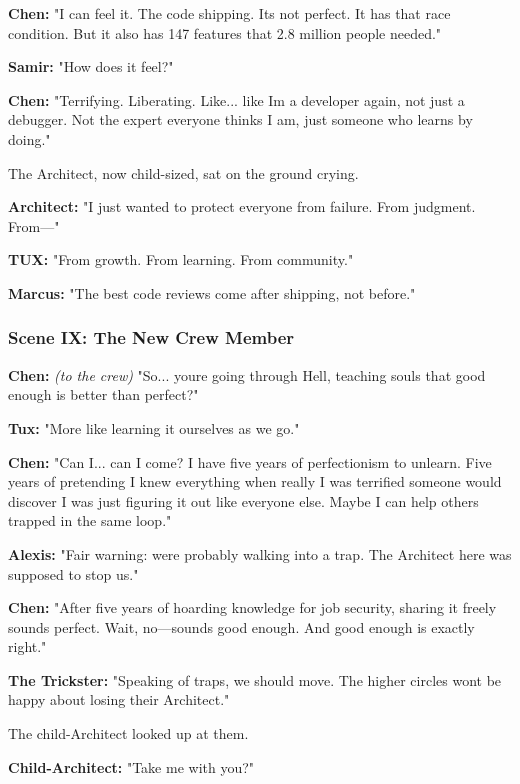 \textbf{Chen:} "I can feel it. The code shipping. It\textquotesingle s not perfect. It has that race condition. But it also has 147 features that 2.8 million people needed."

\textbf{Samir:} "How does it feel?"

\textbf{Chen:} "Terrifying. Liberating. Like... like I\textquotesingle m a developer again, not just a debugger. Not the \textquotesingle expert\textquotesingle{} everyone thinks I am, just someone who learns by doing."

The Architect, now child-sized, sat on the ground crying.

\textbf{Architect:} "I just wanted to protect everyone from failure. From judgment. From---"

\textbf{TUX:} "From growth. From learning. From community."

\textbf{Marcus:} "The best code reviews come after shipping, not before."

\bookdivider

\subsubsection{Scene IX: The New Crew Member}\label{scene-ix-the-new-crew-member}

\textbf{Chen:} \emph{(to the crew)} "So... you\textquotesingle re going through Hell, teaching souls that good enough is better than perfect?"

\textbf{Tux:} "More like learning it ourselves as we go."

\textbf{Chen:} "Can I... can I come? I have five years of perfectionism to unlearn. Five years of pretending I knew everything when really I was terrified someone would discover I was just figuring it out like everyone else. Maybe I can help others trapped in the same loop."

\textbf{Alexis:} "Fair warning: we\textquotesingle re probably walking into a trap. The Architect here was supposed to stop us."

\textbf{Chen:} "After five years of hoarding knowledge for job security, sharing it freely sounds perfect. Wait, no---sounds good enough. And good enough is exactly right."

\textbf{The Trickster:} "Speaking of traps, we should move. The higher circles won\textquotesingle t be happy about losing their Architect."

The child-Architect looked up at them.

\textbf{Child-Architect:} "Take me with you?"

